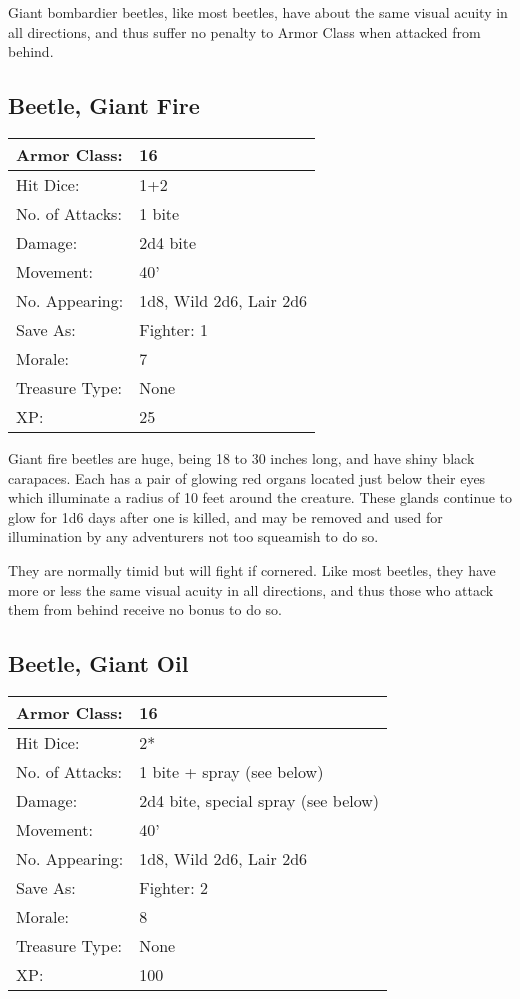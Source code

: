 \documentclass[a4paper,twoside,openany,10pt]{book}
\begin{document}
\begin{multicols}{2}
Giant bombardier beetles, like most beetles, have about the same visual acuity in all directions, and thus suffer no penalty to Armor Class when attacked from behind.

\subsection*{Beetle, Giant Fire}\label{beetle-giant-fire}

\begin{tabularx}{0.48\textwidth}{@{}lX@{}}
Armor Class: & 16 \\\hline
Hit Dice: & 1+2 \\\hline
No. of Attacks: & 1 bite \\\hline
Damage: & 2d4 bite \\\hline
Movement: & 40' \\\hline
No. Appearing: & 1d8, Wild 2d6, Lair 2d6 \\\hline
Save As: & Fighter: 1 \\\hline
Morale: & 7 \\\hline
Treasure Type: & None \\\hline
XP: & 25 \\\hline
\end{tabularx}\medskip

Giant fire beetles are huge, being 18 to 30 inches long, and have shiny black carapaces. Each has a pair of glowing red organs located just below their eyes which illuminate a radius of 10 feet around the creature. These glands continue to glow for 1d6 days after one is killed, and may be removed and used for illumination by any adventurers not too squeamish to do so.

They are normally timid but will fight if cornered. Like most beetles, they have more or less the same visual acuity in all directions, and thus those who attack them from behind receive no bonus to do so.

\subsection*{Beetle, Giant Oil}\label{beetle-giant-oil}

\begin{tabularx}{0.48\textwidth}{@{}lX@{}}
Armor Class: & 16 \\\hline
Hit Dice: & 2* \\\hline
No. of Attacks: & 1 bite + spray (see below) \\\hline
Damage: & 2d4 bite, special spray (see below) \\\hline
Movement: & 40' \\\hline
No. Appearing: & 1d8, Wild 2d6, Lair 2d6 \\\hline
Save As: & Fighter: 2 \\\hline
Morale: & 8 \\\hline
Treasure Type: & None \\\hline
XP: & 100 \\\hline
\end{tabularx}\medskip


\end{multicols}
\end{document}
